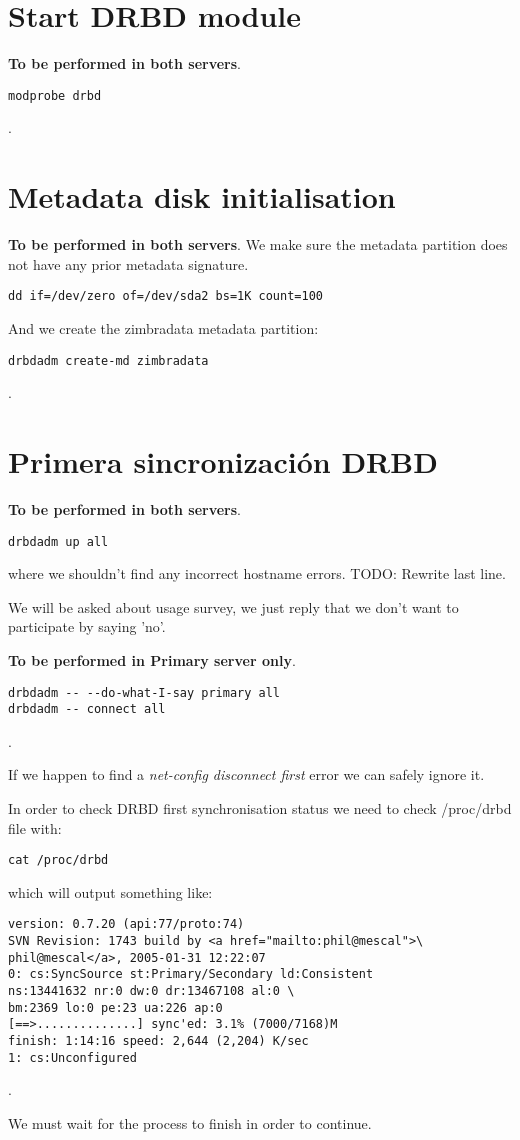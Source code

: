 \section {Start DRBD module}
\textbf{To be performed in both servers}.
\begin{verbatim}
modprobe drbd
\end{verbatim}
.
\section {Metadata disk initialisation}
\textbf{To be performed in both servers}.
We make sure the metadata partition does not have any prior metadata signature.
\begin{verbatim}
dd if=/dev/zero of=/dev/sda2 bs=1K count=100
\end{verbatim}
And we create the zimbradata metadata partition:
\begin{verbatim}
drbdadm create-md zimbradata
\end{verbatim}
.

\section {Primera sincronizaci\'on DRBD}
\textbf{To be performed in both servers}.
\begin{verbatim}
drbdadm up all
\end{verbatim}
where we shouldn't find any incorrect hostname errors.
TODO: Rewrite last line.

We will be asked about usage survey, we just reply that we don't want to participate by saying 'no'.

\textbf{To be performed in Primary server only}.
\begin{verbatim}
drbdadm -- --do-what-I-say primary all
drbdadm -- connect all
\end{verbatim}
.

If we happen to find a \textit{net-config disconnect first} error we can safely ignore it.

In order to check DRBD first synchronisation status we need to check /proc/drbd file with:
\begin{verbatim}
cat /proc/drbd
\end{verbatim}
which will output something like:
\begin{verbatim}
version: 0.7.20 (api:77/proto:74)
SVN Revision: 1743 build by <a href="mailto:phil@mescal">\
phil@mescal</a>, 2005-01-31 12:22:07
0: cs:SyncSource st:Primary/Secondary ld:Consistent
ns:13441632 nr:0 dw:0 dr:13467108 al:0 \
bm:2369 lo:0 pe:23 ua:226 ap:0
[==>..............] sync'ed: 3.1% (7000/7168)M
finish: 1:14:16 speed: 2,644 (2,204) K/sec
1: cs:Unconfigured
\end{verbatim}
.

We must wait for the process to finish in order to continue.







